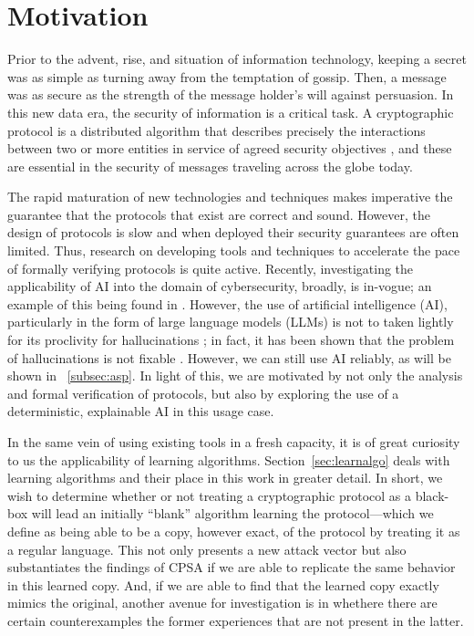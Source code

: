 \documentclass[11pt]{article}
\begin{document}
\section{Motivation}
\label{sec:mot}
Prior to the advent, rise, and situation of information technology, keeping a secret was as simple as turning away from the temptation of gossip. Then, a message was as secure as the strength of the message holder's will against persuasion. In this new data era, the security of information is a critical task. A cryptographic protocol is a distributed algorithm that describes precisely the interactions between two or more entities in service of agreed security objectives \cite{toorani2016securityprotocolsnutshell}, and these are essential in the security of messages traveling across the globe today. 

The rapid maturation of new technologies and techniques makes imperative the guarantee that the protocols that exist are correct and sound. However, the design of protocols is slow and when deployed their security guarantees are often limited. Thus, research on developing tools and techniques to accelerate the pace of formally verifying protocols is quite active. Recently, investigating the applicability of AI into the domain of cybersecurity, broadly, is in-vogue; an example of this being found in \cite{10.1007/978-3-031-87496-3_10}. However, the use of artificial intelligence (AI), particularly in the form of large language models (LLMs) is not to taken lightly for its proclivity for hallucinations \cite{Ji_2023,churilov2026rangeshrinksthreatremains,Huang_2025,10.1093/jla/laae003}; in fact, it has been shown that the problem of hallucinations is not fixable \cite{kalai2025languagemodelshallucinate}. However, we can still use AI reliably, as will be shown in ~\ref{subsec:asp}. In light of this, we are motivated by not only the analysis and formal verification of protocols, but also by exploring the use of a deterministic, explainable AI in this usage case. 

In the same vein of using existing tools in a fresh capacity, it is of great curiosity to us the applicability of learning algorithms. Section~\ref{sec:learnalgo} deals with learning algorithms and their place in this work in greater detail. In short, we wish to determine whether or not treating a cryptographic protocol as a black-box will lead an initially ``blank'' algorithm learning the protocol—which we define as being able to be a copy, however exact, of the protocol by treating it as a regular language. This not only presents a new attack vector but also substantiates the findings of CPSA if we are able to replicate the same behavior in this learned copy. And, if we are able to find that the learned copy exactly mimics the original, another avenue for investigation is in whethere there are certain counterexamples the former experiences that are not present in the latter. 
\end{document}

